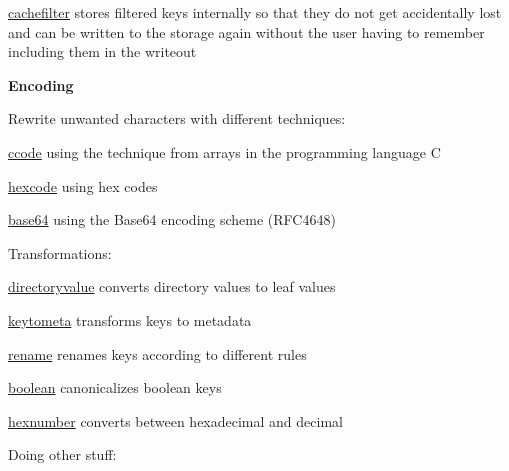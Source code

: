 \begin{DoxyItemize}
\item \hyperlink{md_src_plugins_cachefilter_README_src_plugins_cachefilter_README_md}{cachefilter} stores filtered keys internally so that they do not get accidentally lost and can be written to the storage again without the user having to remember including them in the writeout
\end{DoxyItemize}

{\bfseries Encoding}

Rewrite unwanted characters with different techniques\+:


\begin{DoxyItemize}
\item \hyperlink{md_src_plugins_ccode_README_src_plugins_ccode_README_md}{ccode} using the technique from arrays in the programming language C
\item \hyperlink{md_src_plugins_hexcode_README_src_plugins_hexcode_README_md}{hexcode} using hex codes
\item \hyperlink{md_src_plugins_base64_README_src_plugins_base64_README_md}{base64} using the Base64 encoding scheme (R\+F\+C4648)
\end{DoxyItemize}

Transformations\+:


\begin{DoxyItemize}
\item \hyperlink{md_src_plugins_directoryvalue_README_src_plugins_directoryvalue_README_md}{directoryvalue} converts directory values to leaf values
\item \hyperlink{md_src_plugins_keytometa_README_src_plugins_keytometa_README_md}{keytometa} transforms keys to metadata
\item \hyperlink{md_src_plugins_rename_README_src_plugins_rename_README_md}{rename} renames keys according to different rules
\item \hyperlink{md_src_plugins_boolean_README_src_plugins_boolean_README_md}{boolean} canonicalizes boolean keys
\item \hyperlink{md_src_plugins_hexnumber_README_src_plugins_hexnumber_README_md}{hexnumber} converts between hexadecimal and decimal
\end{DoxyItemize}

Doing other stuff\+:


